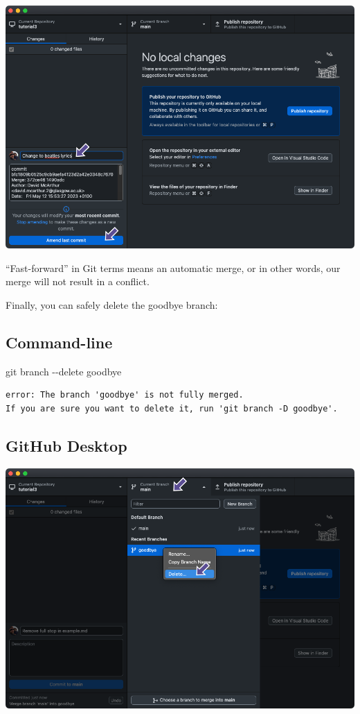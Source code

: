 \documentclass[
  letterpaper,
  DIV=11,
  numbers=noendperiod]{scrartcl}
\newenvironment{Shaded}{\begin{snugshade}}{\end{snugshade}}
\newcommand{\NormalTok}[1]{\textcolor[rgb]{0.00,0.23,0.31}{#1}}
\newcommand{\SpecialCharTok}[1]{\textcolor[rgb]{0.37,0.37,0.37}{#1}}
\begin{document}
\includegraphics{images/image75.png}

``Fast-forward'' in Git terms means an automatic merge, or in other
words, our merge will not result in a conflict.

Finally, you can safely delete the goodbye branch:

\subsection{Command-line}

\begin{Shaded}
\begin{Highlighting}[]
\NormalTok{git branch }\SpecialCharTok{{-}{-}}\NormalTok{delete goodbye}
\end{Highlighting}
\end{Shaded}

\begin{verbatim}
error: The branch 'goodbye' is not fully merged.
If you are sure you want to delete it, run 'git branch -D goodbye'.
\end{verbatim}

\subsection{GitHub Desktop}

\includegraphics{images/image76.png}
\end{document}
